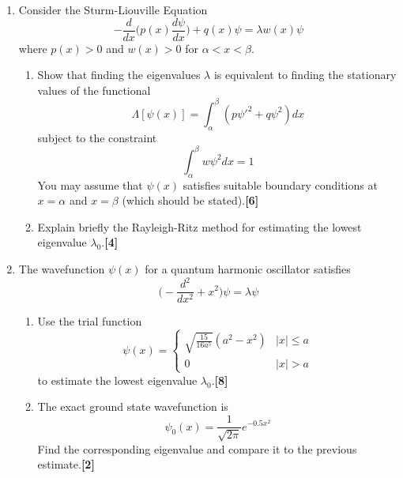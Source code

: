 \documentclass[a4paper]{article}
\begin{document}
\begin{qns}\leavevmode
\begin{enumerate}[label=(\roman*)]
\item Consider the Sturm-Liouville Equation
$$-\frac{d}{dx}\bigg(p(x)\frac{d\psi}{dx}\bigg)+q(x)\psi=\lambda w(x)\psi$$
where $p(x)>0$ and $w(x)>0$ for $\alpha<x<\beta$.
\begin{enumerate}[label=(\alph*)]
\item Show that finding the eigenvalues $\lambda$ is equivalent to finding the stationary values of the functional
$$\Lambda[\psi(x)]=\int_\alpha^\beta(p\psi'^2+q\psi^2)dx$$
subject to the constraint
$$\int_\alpha^\beta w\psi^2dx=1$$
You may assume that $\psi(x)$ satisfies suitable boundary conditions at $x=\alpha$ and $x=\beta$ (which should be stated).\hfill \textbf{[6]}
\item Explain briefly the Rayleigh-Ritz method for estimating the lowest eigenvalue $\lambda_0$.\hfill \textbf{[4]}
\end{enumerate}

\item The wavefunction $\psi(x)$ for a quantum harmonic oscillator satisfies
\begin{equation}
\bigg(-\frac{d^2}{dx^2}+x^2\bigg)\psi=\lambda\psi\tag{*}
\end{equation}
\begin{enumerate}[label=(\alph*)]
\item Use the trial function
$$\psi(x)=
\left\{
        \begin{array}{ll}
      \sqrt{\frac{15}{16a^5}}(a^2-x^2) & |x|\leq a\\
      0 & |x|>a
        \end{array}
    \right.$$
to estimate the lowest eigenvalue $\lambda_0$.\hfill \textbf{[8]}
\item The exact ground state wavefunction is 
$$\psi_0(x)=\frac{1}{\sqrt{2\pi}}e^{-0.5x^2}$$
Find the corresponding eigenvalue and compare it to the previous estimate.\hfill \textbf{[2]}
\end{enumerate}
\end{enumerate}
\end{qns}
\newpage
\end{document}
